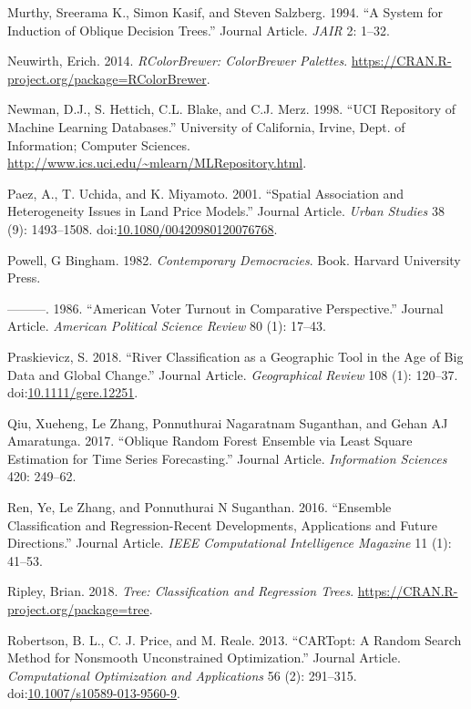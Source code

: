 \documentclass[]{elsarticle} %
\begin{document}
\hypertarget{ref-Murthy1994}{}
Murthy, Sreerama K., Simon Kasif, and Steven Salzberg. 1994. ``A System
for Induction of Oblique Decision Trees.'' Journal Article. \emph{JAIR}
2: 1--32.

\hypertarget{ref-Neuwirth2014}{}
Neuwirth, Erich. 2014. \emph{RColorBrewer: ColorBrewer Palettes}.
\url{https://CRAN.R-project.org/package=RColorBrewer}.

\hypertarget{ref-Newman1998}{}
Newman, D.J., S. Hettich, C.L. Blake, and C.J. Merz. 1998. ``UCI
Repository of Machine Learning Databases.'' University of California,
Irvine, Dept. of Information; Computer Sciences.
\url{http://www.ics.uci.edu/~mlearn/MLRepository.html}.

\hypertarget{ref-Paez2001}{}
Paez, A., T. Uchida, and K. Miyamoto. 2001. ``Spatial Association and
Heterogeneity Issues in Land Price Models.'' Journal Article.
\emph{Urban Studies} 38 (9): 1493--1508.
doi:\href{https://doi.org/10.1080/00420980120076768}{10.1080/00420980120076768}.

\hypertarget{ref-Powell1982}{}
Powell, G Bingham. 1982. \emph{Contemporary Democracies}. Book. Harvard
University Press.

\hypertarget{ref-Powell1986}{}
---------. 1986. ``American Voter Turnout in Comparative Perspective.''
Journal Article. \emph{American Political Science Review} 80 (1):
17--43.

\hypertarget{ref-Praskievicz2018}{}
Praskievicz, S. 2018. ``River Classification as a Geographic Tool in the
Age of Big Data and Global Change.'' Journal Article. \emph{Geographical
Review} 108 (1): 120--37.
doi:\href{https://doi.org/10.1111/gere.12251}{10.1111/gere.12251}.

\hypertarget{ref-QiuZhang2017}{}
Qiu, Xueheng, Le Zhang, Ponnuthurai Nagaratnam Suganthan, and Gehan AJ
Amaratunga. 2017. ``Oblique Random Forest Ensemble via Least Square
Estimation for Time Series Forecasting.'' Journal Article.
\emph{Information Sciences} 420: 249--62.

\hypertarget{ref-RenZhang2016}{}
Ren, Ye, Le Zhang, and Ponnuthurai N Suganthan. 2016. ``Ensemble
Classification and Regression-Recent Developments, Applications and
Future Directions.'' Journal Article. \emph{IEEE Computational
Intelligence Magazine} 11 (1): 41--53.

\hypertarget{ref-Ripley2018}{}
Ripley, Brian. 2018. \emph{Tree: Classification and Regression Trees}.
\url{https://CRAN.R-project.org/package=tree}.

\hypertarget{ref-Robertson2013}{}
Robertson, B. L., C. J. Price, and M. Reale. 2013. ``CARTopt: A Random
Search Method for Nonsmooth Unconstrained Optimization.'' Journal
Article. \emph{Computational Optimization and Applications} 56 (2):
291--315.
doi:\href{https://doi.org/10.1007/s10589-013-9560-9}{10.1007/s10589-013-9560-9}.
\end{document}
